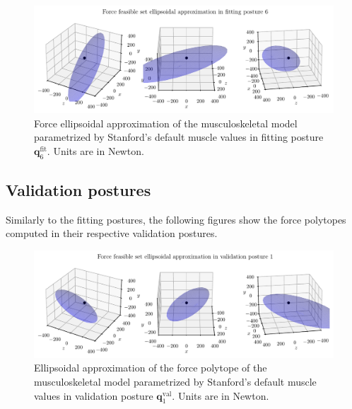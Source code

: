 \begin{figure}[!htb]
    \centering
    \captionsetup{justification=centering}
    \begin{minipage}{\linewidth}
        \centering
        \includegraphics[trim={0 0 0 0}, clip, width=1\linewidth]{img/chapter_4/reconstruction_stanford_imgs/STANFORD_ELLIPSOID_POSTURE_FITTING_06.pdf}
    \end{minipage}
    \caption{Force ellipsoidal approximation of the musculoskeletal model parametrized by Stanford's default muscle values in fitting posture $\mathbf{q}_6^{\text{fit}}$. Units are in Newton.}
    \label{fig:ellipsoid_pose_6}
\end{figure}


\subsection{Validation postures}

Similarly to the fitting postures, the following figures show the force polytopes computed in their respective validation postures.

\begin{figure}[!htb]
    \centering
    \captionsetup{justification=centering}
    \begin{minipage}{\linewidth}
        \centering
        \includegraphics[trim={0 0 0 0}, clip, width=1\linewidth]{img/chapter_4/reconstruction_stanford_imgs/STANFORD_ELLIPSOID_POSTURE_VAL_01.pdf}
    \end{minipage}
    \caption{Ellipsoidal approximation of the force polytope of the musculoskeletal model parametrized by Stanford's default muscle values in validation posture $\mathbf{q}_1^{\text{val}}$. Units are in Newton.}
    \label{fig:ellipsoid_val_pose_1}
\end{figure}

